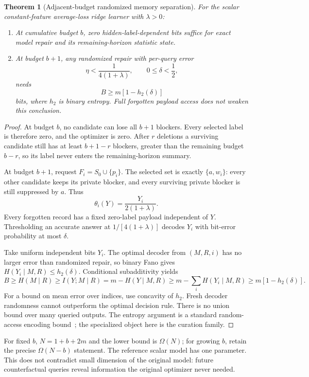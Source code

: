 \documentclass[11pt,a4paper]{article}
\newtheorem{theorem}{Theorem}[section]
\theoremstyle{definition}\newtheorem{definition}[theorem]{Definition}
\begin{document}
\begin{theorem}[Adjacent-budget randomized memory separation]\label{thm:frontier}
For the scalar constant-feature average-loss ridge learner with $\lambda>0$:
\begin{enumerate}
\item At cumulative budget $b$, zero hidden-label-dependent bits suffice for exact model repair and its remaining-horizon statistic state.
\item At budget $b+1$, any randomized repair with per-query error
\[
 \eta<\frac{1}{4(1+\lambda)},\qquad 0\le\delta<\frac12,
\]
needs
\begin{equation}\label{eq:entropy}
 B\ge m[1-h_2(\delta)]
\end{equation}
bits, where $h_2$ is binary entropy. Full forgotten payload access does not weaken this conclusion.
\end{enumerate}
\end{theorem}
\begin{proof}
At budget $b$, no candidate can lose all $b+1$ blockers. Every selected label is therefore zero, and the optimizer is zero. After $r$ deletions a surviving candidate still has at least $b+1-r$ blockers, greater than the remaining budget $b-r$, so its label never enters the remaining-horizon summary.

At budget $b+1$, request $F_i=S_0\cup\{p_i\}$. The selected set is exactly $\{a,w_i\}$: every other candidate keeps its private blocker, and every surviving private blocker is still suppressed by $a$. Thus
\[
 \theta_i(Y)=\frac{Y_i}{2(1+\lambda)}.
\]
Every forgotten record has a fixed zero-label payload independent of $Y$. Thresholding an accurate answer at $1/[4(1+\lambda)]$ decodes $Y_i$ with bit-error probability at most $\delta$.

Take uniform independent bits $Y_i$. The optimal decoder from $(M,R,i)$ has no larger error than randomized repair, so binary Fano gives $H(Y_i\mid M,R)\le h_2(\delta)$. Conditional subadditivity yields
\[
 B\ge H(M\mid R)\ge I(Y;M\mid R)
 =m-H(Y\mid M,R)
 \ge m-\sum_i H(Y_i\mid M,R)
 \ge m[1-h_2(\delta)].
\]
For a bound on mean error over indices, use concavity of $h_2$. Fresh decoder randomness cannot outperform the optimal decision rule. There is no union bound over many queried outputs. The entropy argument is a standard random-access encoding bound~\cite{nayak1999}; the specialized object here is the curation family.
\end{proof}
For fixed $b$, $N=1+b+2m$ and the lower bound is $\Omega(N)$; for growing $b$, retain the precise $\Omega(N-b)$ statement. The reference scalar model has one parameter. This does not contradict small dimension of the original model: future counterfactual queries reveal information the original optimizer never needed.
\end{document}

